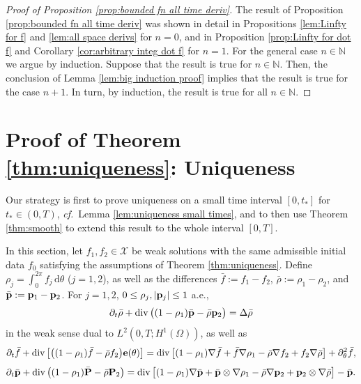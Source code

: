 \documentclass[11pt,a4paper,reqno]{amsart}
\theoremstyle{remark}
\theoremstyle{definition}
\numberwithin{equation}{section}
\DeclareMathOperator{\dv}{div}
\renewcommand{\P}{{\bf P}}
\newcommand{\p}{{\bf p}}
\newcommand{\e}{{\bf e}}
\renewcommand{\d}{\, \mathrm{d} }
\begin{document}
\begin{proof}[Proof of Proposition \ref{prop:bounded fn all time deriv}]
    The result of Proposition \ref{prop:bounded fn all time deriv} %
    was shown in detail in  Propositions \ref{lem:Linfty for f} and \ref{lem:all space derivs} for $n=0$, and in Proposition \ref{prop:Linfty for dot f} and Corollary \ref{cor:arbitrary integ dot f} for $n=1$. For the general case $n\in\mathbb{N}$ we argue by induction. Suppose that the result is true for $n\in\mathbb{N}$. Then, the conclusion of Lemma \ref{lem:big induction proof} implies that the result is true for the case $n+1$. In turn, by induction, the result is true for all $n\in\mathbb{N}$. 
\end{proof}









\section{Proof of Theorem \ref{thm:uniqueness}: Uniqueness}\label{sec:uniqueness}

Our strategy is first to prove uniqueness on a small time interval $[0,t_*]$ for $t_* \in (0,T)$, \textit{cf.}~Lemma \ref{lem:uniqueness small times}, and to then use Theorem \ref{thm:smooth} to extend this result to the whole interval $[0,T]$. 

In this section, let $f_1, f_2 \in \mathcal{X}$ be weak solutions with the same admissible initial data $f_0$ satisfying the assumptions of Theorem \ref{thm:uniqueness}. Define $\rho_j = \int_0^{2\pi} f_j \d \theta$ ($j=1,2$), as well as the differences $\bar{f} := f_1-f_2$, $\bar{\rho} := \rho_1 - \rho_2$, and $\bar{\p} := \p_1 - \p_2$. For $j=1,2$, 
$ 0 \leq \rho_j , |\p_j| \leq 1$ a.e., 
\begin{equation}\label{eq:rho bar eqn}
    \partial_t \bar{\rho} + \dv\big((1-\rho_1)\bar{\p} - \bar{\rho}\p_2\big) = \Delta \bar{\rho} 
\end{equation}
in the weak sense dual to $L^2(0,T;H^1(\Omega))$, as well as 
\begin{equation}\label{eq:f bar eqn}
    \partial_t \bar{f} + \dv\big[\big( (1-\rho_1)\bar{f} - \bar{\rho}f_2 \big)\e(\theta) \big] = \dv\big[ (1-\rho_1)\nabla\bar{f} + \bar{f} \nabla \rho_1 - \bar{\rho}\nabla f_2 + f_2 \nabla \bar{\rho}   \big] + \partial^2_\theta \bar{f}, 
\end{equation}
\begin{equation}\label{eq:p bar eqn}
    \partial_t \bar{\p} + \dv \big( (1-\rho_1)\bar{\P} - \bar{\rho}\P_2 \big)  = \dv\big[ (1-\rho_1)\nabla\bar{\p} + \bar{\p} \otimes \nabla \rho_1 - \bar{\rho}\nabla \p_2 + \p_2 \otimes \nabla \bar{\rho}   \big] - \bar{\p}. 
\end{equation}
\end{document}
